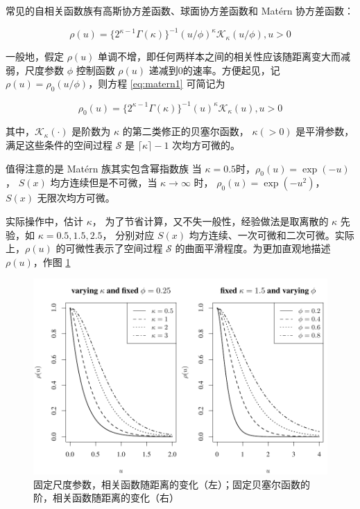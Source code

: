 \documentclass[12pt,a4paper,UTF8,twoside]{book}
\theoremstyle{definition}
\theoremstyle{definition}
\theoremstyle{definition}
\theoremstyle{remark}
\begin{document}
常见的自相关函数族有高斯协方差函数、球面协方差函数和 Matérn 协方差函数：

\begin{equation}
\rho(u)=\{2^{\kappa -1}\Gamma(\kappa)\}^{-1}(u/\phi)^{\kappa}\mathcal{K}_{\kappa}(u/\phi),u > 0 \label{eq:matern1}
\end{equation}

\noindent 一般地，假定 \(\rho(u)\)
单调不增，即任何两样本之间的相关性应该随距离变大而减弱，尺度参数
\(\phi\) 控制函数 \(\rho(u)\) 递减到0的速率。方便起见，记
\(\rho(u) = \rho_{0}(u/\phi)\)，则方程 \eqref{eq:matern1} 可简记为

\begin{equation}
\rho_{0}(u)=\{2^{\kappa -1}\Gamma(\kappa)\}^{-1}(u)^{\kappa}\mathcal{K}_{\kappa}(u),u > 0 \label{eq:matern2}
\end{equation}

\noindent 其中，\(\mathcal{K}_{\kappa}(\cdot)\) 是阶数为 \(\kappa\)
的第二类修正的贝塞尔函数， \(\kappa(>0)\)
是平滑参数，满足这些条件的空间过程 \(\mathcal{S}\) 是
\(\lceil\kappa\rceil-1\) 次均方可微的。

值得注意的是 Matérn 族其实包含幂指数族 \noindent 当
\(\kappa = 0.5\)时，\(\rho_{0}(u) = \exp(-u)\)， \(S(x)\)
均方连续但是不可微，当 \(\kappa \to \infty\) 时，
\(\rho_{0}(u) = \exp(-u^2)\)， \(S(x)\) 无限次均方可微。

实际操作中，估计 \(\kappa\)，
为了节省计算，又不失一般性，经验做法是取离散的 \(\kappa\) 先验，如
\(\kappa = 0.5, 1.5, 2.5\)， 分别对应 \(S(x)\)
均方连续、一次可微和二次可微。实际上，\(\rho(u)\) 的可微性表示了空间过程
\(\mathcal{S}\) 的曲面平滑程度。为更加直观地描述 \(\rho(u)\)，作图
\ref{fig:matern-2d}

\begin{figure}

{\centering \includegraphics[width=0.7\linewidth]{figures/matern} 

}

\caption{固定尺度参数，相关函数随距离的变化（左）；固定贝塞尔函数的阶，相关函数随距离的变化（右）}\label{fig:matern-2d}
\end{figure}
\end{document}
